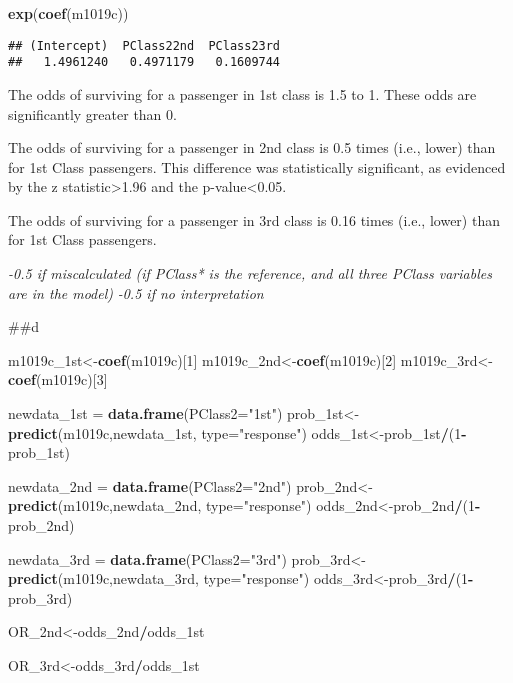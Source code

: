 \documentclass[]{article}
\newenvironment{Shaded}{\begin{snugshade}}{\end{snugshade}}
\newcommand{\DataTypeTok}[1]{\textcolor[rgb]{0.13,0.29,0.53}{#1}}
\newcommand{\DecValTok}[1]{\textcolor[rgb]{0.00,0.00,0.81}{#1}}
\newcommand{\KeywordTok}[1]{\textcolor[rgb]{0.13,0.29,0.53}{\textbf{#1}}}
\newcommand{\NormalTok}[1]{#1}
\newcommand{\OperatorTok}[1]{\textcolor[rgb]{0.81,0.36,0.00}{\textbf{#1}}}
\newcommand{\StringTok}[1]{\textcolor[rgb]{0.31,0.60,0.02}{#1}}
\begin{document}
\begin{Shaded}
\begin{Highlighting}[]
\KeywordTok{exp}\NormalTok{(}\KeywordTok{coef}\NormalTok{(m1019c))}
\end{Highlighting}
\end{Shaded}

\begin{verbatim}
## (Intercept)  PClass22nd  PClass23rd 
##   1.4961240   0.4971179   0.1609744
\end{verbatim}

The odds of surviving for a passenger in 1st class is 1.5 to 1. These
odds are significantly greater than 0.

The odds of surviving for a passenger in 2nd class is 0.5 times (i.e.,
lower) than for 1st Class passengers. This difference was statistically
significant, as evidenced by the z statistic\textgreater{}1.96 and the
p-value\textless{}0.05.

The odds of surviving for a passenger in 3rd class is 0.16 times (i.e.,
lower) than for 1st Class passengers.

\emph{-0.5 if miscalculated (if PClass* is the reference, and all three
PClass variables are in the model) } \emph{-0.5 if no interpretation}

\#\#d

\begin{Shaded}
\begin{Highlighting}[]
\NormalTok{m1019c_1st<-}\KeywordTok{coef}\NormalTok{(m1019c)[}\DecValTok{1}\NormalTok{]}
\NormalTok{m1019c_2nd<-}\KeywordTok{coef}\NormalTok{(m1019c)[}\DecValTok{2}\NormalTok{]}
\NormalTok{m1019c_3rd<-}\KeywordTok{coef}\NormalTok{(m1019c)[}\DecValTok{3}\NormalTok{]}


\NormalTok{newdata_1st =}\StringTok{ }\KeywordTok{data.frame}\NormalTok{(}\DataTypeTok{PClass2=}\StringTok{"1st"}\NormalTok{)}
\NormalTok{prob_1st<-}\KeywordTok{predict}\NormalTok{(m1019c,newdata_1st, }\DataTypeTok{type=}\StringTok{"response"}\NormalTok{)}
\NormalTok{odds_1st<-prob_1st}\OperatorTok{/}\NormalTok{(}\DecValTok{1}\OperatorTok{-}\NormalTok{prob_1st)}

\NormalTok{newdata_2nd =}\StringTok{ }\KeywordTok{data.frame}\NormalTok{(}\DataTypeTok{PClass2=}\StringTok{"2nd"}\NormalTok{)}
\NormalTok{prob_2nd<-}\KeywordTok{predict}\NormalTok{(m1019c,newdata_2nd, }\DataTypeTok{type=}\StringTok{"response"}\NormalTok{)}
\NormalTok{odds_2nd<-prob_2nd}\OperatorTok{/}\NormalTok{(}\DecValTok{1}\OperatorTok{-}\NormalTok{prob_2nd)}

\NormalTok{newdata_3rd =}\StringTok{ }\KeywordTok{data.frame}\NormalTok{(}\DataTypeTok{PClass2=}\StringTok{"3rd"}\NormalTok{)}
\NormalTok{prob_3rd<-}\KeywordTok{predict}\NormalTok{(m1019c,newdata_3rd, }\DataTypeTok{type=}\StringTok{"response"}\NormalTok{)}
\NormalTok{odds_3rd<-prob_3rd}\OperatorTok{/}\NormalTok{(}\DecValTok{1}\OperatorTok{-}\NormalTok{prob_3rd)}

\NormalTok{OR_2nd<-odds_2nd}\OperatorTok{/}\NormalTok{odds_1st}

\NormalTok{OR_3rd<-odds_3rd}\OperatorTok{/}\NormalTok{odds_1st}
\end{Highlighting}
\end{Shaded}
\end{document}
